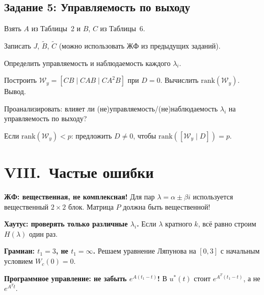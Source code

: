 \documentclass[12pt,a4paper]{article}
\begin{document}
	\subsection{Задание 5: Управляемость по выходу}
	\begin{algo}
		\item Взять $A$ из Таблицы~2 и $B$, $C$ из Таблицы~6.
		\item Записать $J$, $\tilde{B}$, $\tilde{C}$ (можно использовать ЖФ из предыдущих заданий).
		\item Определить управляемость и наблюдаемость каждого $\lambda_i$.
		\item Построить $\mathcal{W}_y=[CB \mid CAB \mid CA^2B]$ при $D=0$. Вычислить $\mathrm{rank}(\mathcal{W}_y)$. Вывод.
		\item Проанализировать: влияет ли (не)управляемость/(не)наблюдаемость $\lambda_i$ на управляемость по выходу?
		\item Если $\mathrm{rank}(\mathcal{W}_y)<p$: предложить $D\neq0$, чтобы $\mathrm{rank}([\mathcal{W}_y \mid D])=p$.
	\end{algo}
	
	\section{VIII.~Частые ошибки}
	
	\begin{dangerbox}
		\textbf{ЖФ: вещественная, не комплексная!}
		Для пар $\lambda=\alpha\pm\beta i$ используется вещественный $2\times2$ блок.
		Матрица $P$ должна быть вещественной!
	\end{dangerbox}
	
	\begin{dangerbox}
		\textbf{Хаутус: проверять только различные $\lambda_i$.}
		Если $\lambda$ кратного $k$, всё равно строим $H(\lambda)$ один раз.
	\end{dangerbox}
	
	\begin{dangerbox}
		\textbf{Грамиан: $t_1=3$, не $t_1=\infty$.}
		Решаем уравнение Ляпунова на $[0,3]$ с начальным условием $W_c(0)=0$.
	\end{dangerbox}
	
	\begin{dangerbox}
		\textbf{Программное управление: не забыть $e^{A(t_1-t)}$!}
		В $u^*(t)$ стоит $e^{A^T(t_1-t)}$, а не $e^{A^Tt}$.
	\end{dangerbox}
	
\end{document}
